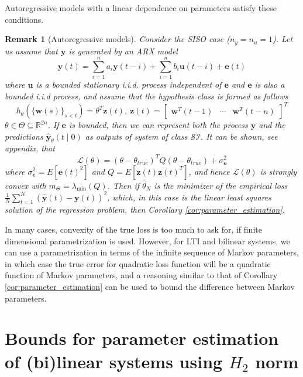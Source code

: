 \documentclass{ifacconf}
\def\rve{{\mathbf{e}}}
\def\rvu{{\mathbf{i}}}
\def\rvu{{\mathbf{u}}}
\def\rvw{{\mathbf{w}}}
\def\rvy{{\mathbf{y}}}
\def\rvz{{\mathbf{z}}}
\newtheorem{Remark}{Remark}[section]
\newcommand{\class}{\(\mathcal{SI}\)}
\begin{document}
Autoregressive models with a linear dependence on parameters satisfy these
conditions.
\begin{Remark}[Autoregressive models]
    \label{rem:fir:param}
    Consider the SISO case ($n_y=n_u=1$).
    Let us assume that 
    $\rvy$ is generated by an ARX model
    \[ \rvy(t)=\sum_{i=1}^{n} a_i \rvy(t-i) + \sum_{i=1}^{n} b_i \rvu(t-i) + \rve(t) \]
    where $\rvu$ is a bounded stationary i.i.d. process independent
    of $\rve$ and $\rve$ is also a bounded i.i.d process,
    and assume that the hypothesis class is formed as follows
    \[ h_{\theta}(\{\rvw(s)\}_{s < t}) = \theta^T \rvz(t), ~
       \rvz(t)=\begin{bmatrix} \rvw^T(t-1) & \cdots & \rvw^T(t-n) \end{bmatrix}^T \]
      $\theta \in \Theta \subseteq \mathbb{R}^{2n}$.
    If $\rve$ is bounded, then we can represent both the process $\rvy$ and the predictions $\hat{\rvy}_{\theta}(t\mid 0)$
    as outputs of system of class \class{}. %
    It can be shown, see appendix, that %
    \[ \mathcal{L}(\theta)=(\theta-\theta_{true})^T Q (\theta-\theta_{true})
       + \sigma_{\rve}^2
    \]
    where  $\sigma_{\rve}^2=E[\rve(t)^2]$ and 
    $Q=E[\rvz(t)\rvz(t)^T]$,  %
    and hence $\mathcal{L}(\theta)$ is strongly convex with $m_{\Theta}=\lambda_{\min}(Q)$.
    Then if $\hat{\theta}_N$ is the minimizer of the empirical loss
    \( \frac{1}{N} \sum_{t=1}^{N} (\hat{\rvy}(t)-\rvy(t))^2 \), which, in this 
    case is the linear least squares solution of the regression problem,
    then Corollary \ref{cor:parameter_estimation}. 
  \end{Remark}



In many cases, convexity of the true loss is too much to ask for, if finite dimensional parametrization is used. However, for LTI and bilinear systems, we can use a parametrization in terms of the infinite sequence of Markov parameters, in which case the true error for quadratic loss function will be a quadratic function of Markov parameters, and a reasoning similar to that of Corollary \ref{cor:parameter_estimation} can be used to bound the difference between 
Markov parameters. 


\section{Bounds for parameter estimation of (bi)linear systems using $H_2$ norm}
\end{document}
